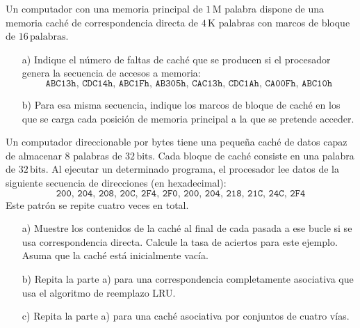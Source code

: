 \begin{ejercicio}
    Un computador con una memoria principal de \(1 \, \text{M}\) palabra dispone de una memoria caché de correspondencia directa de \(4 \, \text{K}\) palabras con marcos de bloque de \(16 \, \text{palabras}\).
    \begin{itemize}
        \item[a)] Indique el número de faltas de caché que se producen si el procesador genera la secuencia de accesos a memoria:
            \[ \texttt{ABC13h, CDC14h, ABC1Fh, AB305h, CAC13h, CDC1Ah, CA00Fh, ABC10h} \]
        \item[b)] Para esa misma secuencia, indique los marcos de bloque de caché en los que se carga cada posición de memoria principal a la que se pretende acceder.
    \end{itemize}
\end{ejercicio}

\begin{ejercicio}
    Un computador direccionable por bytes tiene una pequeña caché de datos capaz de almacenar \(8\) palabras de \(32 \, \text{bits}\). Cada bloque de caché consiste en una palabra de \(32 \, \text{bits}\). Al ejecutar un determinado programa, el procesador lee datos de la siguiente secuencia de direcciones (en hexadecimal):
    \[ \texttt{200, 204, 208, 20C, 2F4, 2F0, 200, 204, 218, 21C, 24C, 2F4} \]
    Este patrón se repite cuatro veces en total.
    \begin{itemize}
        \item[a)] Muestre los contenidos de la caché al final de cada pasada a ese bucle si se usa correspondencia directa. Calcule la tasa de aciertos para este ejemplo. Asuma que la caché está inicialmente vacía.
        \item[b)] Repita la parte a) para una correspondencia completamente asociativa que usa el algoritmo de reemplazo LRU.
        \item[c)] Repita la parte a) para una caché asociativa por conjuntos de cuatro vías.
    \end{itemize}
\end{ejercicio}

